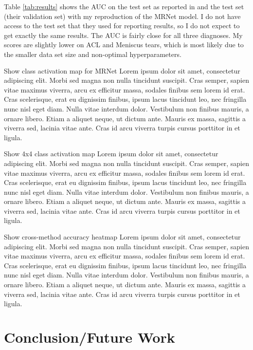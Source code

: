\documentclass[10pt,twocolumn,letterpaper]{article}
\begin{document}
Table \ref{tab:results} shows the AUC on the test set as reported in \cite{bien2018deep} and the test set (their validation set) with my reproduction of the MRNet model. I do not have access to the test set that they used for reporting results, so I do not expect to get exactly the same results. The AUC is fairly close for all three diagnoses. My scores are slightly lower on ACL and Meniscus tears, which is most likely due to the smaller data set size and non-optimal hyperparameters.

Show class activation map for MRNet
Lorem ipsum dolor sit amet, consectetur adipiscing elit. Morbi sed magna non nulla tincidunt suscipit. Cras semper, sapien vitae maximus viverra, arcu ex efficitur massa, sodales finibus sem lorem id erat. Cras scelerisque, erat eu dignissim finibus, ipsum lacus tincidunt leo, nec fringilla nunc nisl eget diam. Nulla vitae interdum dolor. Vestibulum non finibus mauris, a ornare libero. Etiam a aliquet neque, ut dictum ante. Mauris ex massa, sagittis a viverra sed, lacinia vitae ante. Cras id arcu viverra turpis cursus porttitor in et ligula.

Show 4x4 class activation map
Lorem ipsum dolor sit amet, consectetur adipiscing elit. Morbi sed magna non nulla tincidunt suscipit. Cras semper, sapien vitae maximus viverra, arcu ex efficitur massa, sodales finibus sem lorem id erat. Cras scelerisque, erat eu dignissim finibus, ipsum lacus tincidunt leo, nec fringilla nunc nisl eget diam. Nulla vitae interdum dolor. Vestibulum non finibus mauris, a ornare libero. Etiam a aliquet neque, ut dictum ante. Mauris ex massa, sagittis a viverra sed, lacinia vitae ante. Cras id arcu viverra turpis cursus porttitor in et ligula.

Show cross-method accuracy heatmap
Lorem ipsum dolor sit amet, consectetur adipiscing elit. Morbi sed magna non nulla tincidunt suscipit. Cras semper, sapien vitae maximus viverra, arcu ex efficitur massa, sodales finibus sem lorem id erat. Cras scelerisque, erat eu dignissim finibus, ipsum lacus tincidunt leo, nec fringilla nunc nisl eget diam. Nulla vitae interdum dolor. Vestibulum non finibus mauris, a ornare libero. Etiam a aliquet neque, ut dictum ante. Mauris ex massa, sagittis a viverra sed, lacinia vitae ante. Cras id arcu viverra turpis cursus porttitor in et ligula.

\section{Conclusion/Future Work} %
\end{document}

